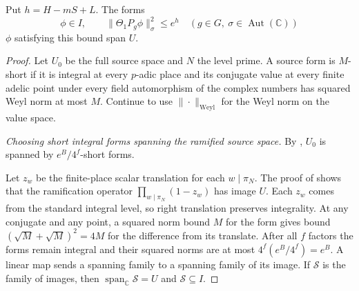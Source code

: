 \begin{theorem}
\label{thm:short-forms}
\emitthmsource
Put $h=H-mS+L$. The forms
\begin{equation}
  \phi\in I,\qquad
  \|\Theta_1P_g\phi\|_\sigma^2\le e^h
  \quad (g\in G,\ \sigma\in\operatorname{Aut}(\mathbb C))
\label{eq:a-short}
\end{equation}
$\phi$ satisfying this bound span $U$.
\end{theorem}
\begin{proof}
Let $U_0$ be the full source space and $N$ the level prime. A source form is $M$-short if it is integral at every $p$-adic place and its conjugate value at every finite adelic point under every field automorphism of the complex numbers has squared Weyl norm at most $M$. Continue to use $\|\cdot\|_{\mathrm{Weyl}}$ for the Weyl norm on the value space.

\emph{Choosing short integral forms spanning the ramified source space.}
By , $U_0$ is spanned by $e^B/4^f$-short forms.

Let $z_w$ be the finite-place scalar translation for each $w\mid\pi_N$. The proof of  shows that the ramification operator $\prod_{w\mid\pi_N}(1-z_w)$ has image $U$. Each $z_w$ comes from the standard integral level, so right translation preserves integrality. At any conjugate and any point, a squared norm bound $M$ for the form gives bound $(\sqrt M+\sqrt M)^2=4M$ for the difference from its translate. After all $f$ factors the forms remain integral and their squared norms are at most $4^f(e^B/4^f)=e^B$. A linear map sends a spanning family to a spanning family of its image. If $\mathcal S$ is the family of images, then $\operatorname{span}_{\mathbb C}\mathcal S=U$ and $\mathcal S\subseteq I$.


\end{proof}
